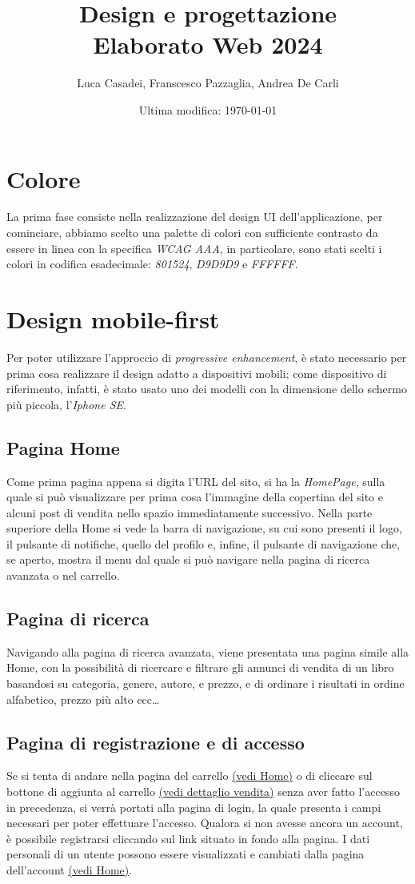\documentclass[a4paper]{report}
\author{Luca Casadei, Franscesco Pazzaglia, Andrea De Carli}
\title{\textbf{Design e progettazione\\Elaborato Web 2024}}
\date{Ultima modifica: \today}
\begin{document}
	\maketitle
	\section{Colore}
	La prima fase consiste nella realizzazione del design UI dell'applicazione, per cominciare, abbiamo scelto una palette di colori con sufficiente contrasto da essere in linea con la specifica \textit{WCAG AAA}, in particolare, sono stati scelti i colori in codifica esadecimale: \textit{801524}, \textit{D9D9D9} e \textit{FFFFFF}.
	\section{Design mobile-first}
	Per poter utilizzare l'approccio di \textit{progressive enhancement}, è stato necessario per prima cosa realizzare il design adatto a dispositivi mobili; come dispositivo di riferimento, infatti, è stato usato uno dei modelli con la dimensione dello schermo più piccola, l'\textit{Iphone SE}.
	\subsection{Pagina Home} \label{ss:home}
	Come prima pagina appena si digita l'URL del sito, si ha la \textit{HomePage}, sulla quale si può visualizzare per prima cosa l'immagine della copertina del sito e alcuni post di vendita nello spazio immediatamente successivo. Nella parte superiore della Home si vede la barra di navigazione, su cui sono presenti il logo, il pulsante di notifiche, quello del profilo e, infine, il pulsante di navigazione che, se aperto, mostra il menu dal quale si può navigare nella pagina di ricerca avanzata o nel carrello.
	\subsection{Pagina di ricerca}
	Navigando alla pagina di ricerca avanzata, viene presentata una pagina simile alla Home, con la possibilità di ricercare e filtrare gli annunci di vendita di un libro basandosi su categoria, genere, autore, e prezzo, e di ordinare i risultati in ordine alfabetico, prezzo più alto ecc\dots
	\subsection{Pagina di registrazione e di accesso}
	Se si tenta di andare nella pagina del carrello \hyperref[ss:home]{(vedi Home)} o di cliccare sul bottone di aggiunta al carrello \hyperref[ss:home]{(vedi dettaglio vendita)} senza aver fatto l'accesso in precedenza, si verrà portati alla pagina di login, la quale presenta i campi necessari per poter effettuare l'accesso. Qualora si non avesse ancora un account, è possibile registrarsi cliccando sul link situato in fondo alla pagina. I dati personali di un utente possono essere visualizzati e cambiati dalla pagina dell'account \hyperref[ss:home]{(vedi Home)}.
\end{document}

